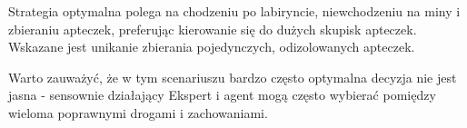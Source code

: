 Strategia optymalna polega na chodzeniu po labiryncie, niewchodzeniu na miny i zbieraniu apteczek, preferując kierowanie się do dużych skupisk apteczek. Wskazane jest unikanie zbierania pojedynczych, odizolowanych apteczek.

Warto zauważyć, że w tym scenariuszu bardzo często optymalna decyzja nie jest jasna - sensownie działający Ekspert i agent mogą często wybierać pomiędzy wieloma poprawnymi drogami i zachowaniami.

\begin{figure}[H]
	\begin{floatrow}
	\end{floatrow}
\end{figure}
